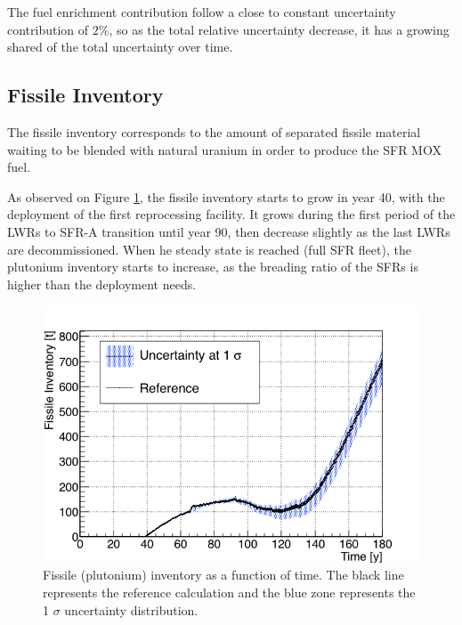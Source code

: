 \documentclass{anstrans}
\begin{document}
The fuel enrichment contribution follow a close to constant uncertainty
contribution of $2\%$, so as the total relative uncertainty decrease, it
has a growing shared of the total uncertainty over time.

\subsection{Fissile Inventory}
The fissile inventory corresponds to the amount of separated fissile material waiting to
be blended with natural uranium in order to produce the \gls{SFR} MOX fuel.

As observed on Figure \ref{fig:pu_full}, the fissile inventory starts to grow in
year 40, with the deployment of the first reprocessing facility.  It grows
during the first period of the \glspl{LWR} to \gls{SFR}-A transition until
year 90, then decrease slightly as the last \glspl{LWR} are decommissioned.
When he steady state is reached (full \gls{SFR} fleet), the plutonium
inventory starts to increase, as the breading ratio of the \glspl{SFR} is higher
than the deployment needs.

\begin{figure}[ht] %
    \centering
    \includegraphics[scale=0.35]{pu_full}
    \caption{Fissile (plutonium) inventory as a function of time.  The black line
        represents the reference calculation and the blue zone
        represents the 1 $\sigma$ uncertainty distribution.}\label{fig:pu_full}
\end{figure}
\end{document}
